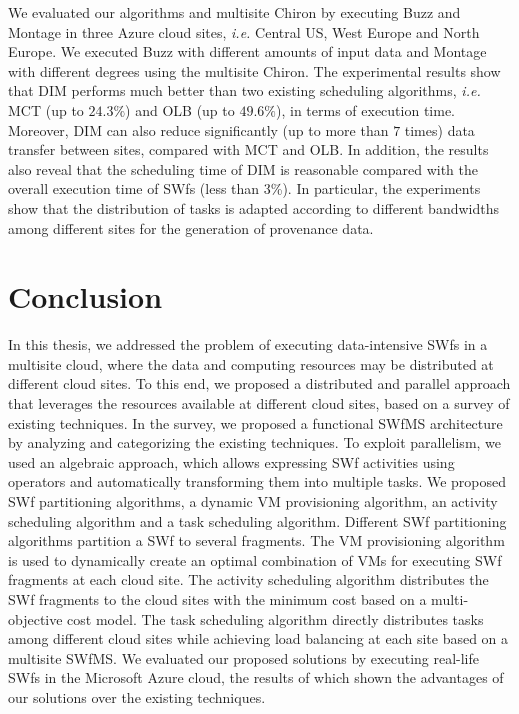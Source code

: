 We evaluated our algorithms and multisite Chiron by executing Buzz and Montage in three Azure cloud sites, \textit{i.e.} Central US, West Europe and North Europe. We executed Buzz with different amounts of input data and Montage with different degrees using the multisite Chiron. The experimental results show that DIM performs much better than two existing scheduling algorithms, \textit{i.e.} MCT (up to $24.3\%$) and OLB (up to $49.6\%$), in terms of execution time. Moreover, DIM can also reduce significantly (up to more than $7$ times) data transfer between sites, compared with MCT and OLB. In addition, the results also reveal that the scheduling time of DIM is reasonable compared with the overall execution time of SWfs (less than $3$\%). In particular, the experiments show that the distribution of tasks is adapted according to different bandwidths among different sites for the generation of provenance data.

\section*{Conclusion}

In this thesis, we addressed the problem of executing data-intensive SWfs in a multisite cloud, where the data and computing resources may be distributed at different cloud sites. 
To this end, we proposed a distributed and parallel approach that leverages the resources available at different cloud sites, based on a survey of existing techniques.
In the survey, we proposed a functional SWfMS architecture by analyzing and categorizing the existing techniques. 
To exploit parallelism, we used an algebraic approach, which allows expressing SWf activities using operators and automatically transforming them into multiple tasks.
We proposed SWf partitioning algorithms, a dynamic VM provisioning algorithm, an activity scheduling algorithm and a task scheduling algorithm. 
Different SWf partitioning algorithms partition a SWf to several fragments. 
The VM provisioning algorithm is used to dynamically create an optimal combination of VMs for executing SWf fragments at each cloud site. 
The activity scheduling algorithm distributes the SWf fragments to the cloud sites with the minimum cost based on a multi-objective cost model. 
The task scheduling algorithm directly distributes tasks among different cloud sites while achieving load balancing at each site based on a multisite SWfMS. 
We evaluated our proposed solutions by executing real-life SWfs in the Microsoft Azure cloud, the results of which shown the advantages of our solutions over the existing techniques.

